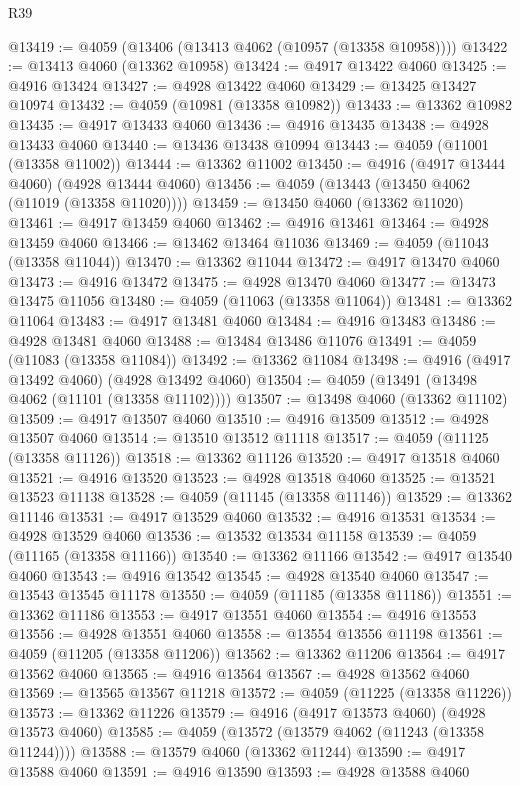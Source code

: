 \begin{lexlean}{R39}
\begin{coremodule}
@13419 := @4059 (@13406 (@13413 @4062 (@10957 (@13358 @10958))))
@13422 := @13413 @4060 (@13362 @10958)
@13424 := @4917 @13422 @4060
@13425 := @4916 @13424
@13427 := @4928 @13422 @4060
@13429 := @13425 @13427 @10974
@13432 := @4059 (@10981 (@13358 @10982))
@13433 := @13362 @10982
@13435 := @4917 @13433 @4060
@13436 := @4916 @13435
@13438 := @4928 @13433 @4060
@13440 := @13436 @13438 @10994
@13443 := @4059 (@11001 (@13358 @11002))
@13444 := @13362 @11002
@13450 := @4916 (@4917 @13444 @4060) (@4928 @13444 @4060)
@13456 := @4059 (@13443 (@13450 @4062 (@11019 (@13358 @11020))))
@13459 := @13450 @4060 (@13362 @11020)
@13461 := @4917 @13459 @4060
@13462 := @4916 @13461
@13464 := @4928 @13459 @4060
@13466 := @13462 @13464 @11036
@13469 := @4059 (@11043 (@13358 @11044))
@13470 := @13362 @11044
@13472 := @4917 @13470 @4060
@13473 := @4916 @13472
@13475 := @4928 @13470 @4060
@13477 := @13473 @13475 @11056
@13480 := @4059 (@11063 (@13358 @11064))
@13481 := @13362 @11064
@13483 := @4917 @13481 @4060
@13484 := @4916 @13483
@13486 := @4928 @13481 @4060
@13488 := @13484 @13486 @11076
@13491 := @4059 (@11083 (@13358 @11084))
@13492 := @13362 @11084
@13498 := @4916 (@4917 @13492 @4060) (@4928 @13492 @4060)
@13504 := @4059 (@13491 (@13498 @4062 (@11101 (@13358 @11102))))
@13507 := @13498 @4060 (@13362 @11102)
@13509 := @4917 @13507 @4060
@13510 := @4916 @13509
@13512 := @4928 @13507 @4060
@13514 := @13510 @13512 @11118
@13517 := @4059 (@11125 (@13358 @11126))
@13518 := @13362 @11126
@13520 := @4917 @13518 @4060
@13521 := @4916 @13520
@13523 := @4928 @13518 @4060
@13525 := @13521 @13523 @11138
@13528 := @4059 (@11145 (@13358 @11146))
@13529 := @13362 @11146
@13531 := @4917 @13529 @4060
@13532 := @4916 @13531
@13534 := @4928 @13529 @4060
@13536 := @13532 @13534 @11158
@13539 := @4059 (@11165 (@13358 @11166))
@13540 := @13362 @11166
@13542 := @4917 @13540 @4060
@13543 := @4916 @13542
@13545 := @4928 @13540 @4060
@13547 := @13543 @13545 @11178
@13550 := @4059 (@11185 (@13358 @11186))
@13551 := @13362 @11186
@13553 := @4917 @13551 @4060
@13554 := @4916 @13553
@13556 := @4928 @13551 @4060
@13558 := @13554 @13556 @11198
@13561 := @4059 (@11205 (@13358 @11206))
@13562 := @13362 @11206
@13564 := @4917 @13562 @4060
@13565 := @4916 @13564
@13567 := @4928 @13562 @4060
@13569 := @13565 @13567 @11218
@13572 := @4059 (@11225 (@13358 @11226))
@13573 := @13362 @11226
@13579 := @4916 (@4917 @13573 @4060) (@4928 @13573 @4060)
@13585 := @4059 (@13572 (@13579 @4062 (@11243 (@13358 @11244))))
@13588 := @13579 @4060 (@13362 @11244)
@13590 := @4917 @13588 @4060
@13591 := @4916 @13590
@13593 := @4928 @13588 @4060

\end{coremodule}
\end{lexlean}
